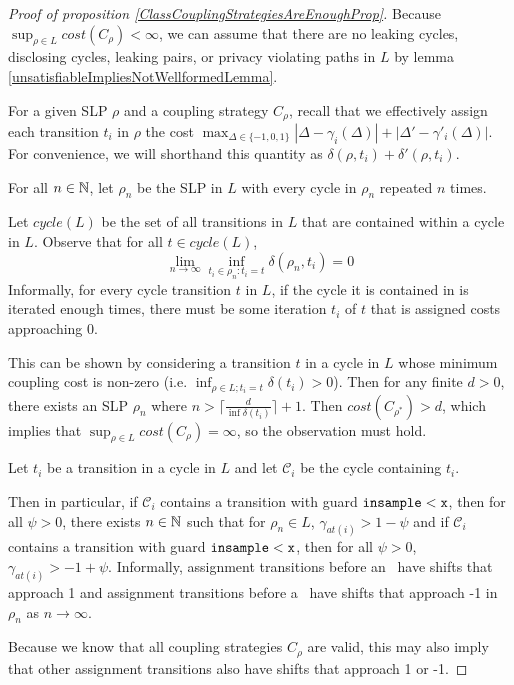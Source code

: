 \begin{proof}[Proof of proposition \ref{ClassCouplingStrategiesAreEnoughProp}]


    Because $\sup_{\rho\in L}cost(C_\rho)< \infty$, we can assume that there are no leaking cycles, disclosing cycles, leaking pairs, or privacy violating paths in $L$ by lemma \ref{unsatisfiableImpliesNotWellformedLemma}.


    For a given SLP $\rho$ and a coupling strategy $C_\rho$, recall that we effectively assign each transition $t_i$ in $\rho$ the cost $\max_{\Delta \in \{-1, 0, 1\}}|\Delta - \gamma_i(\Delta)| + |\Delta' - \gamma'_i(\Delta)|$. For convenience, we will shorthand this quantity as $\delta(\rho, t_i) + \delta'(\rho, t_i)$.


    For all $n\in \NN$, let $\rho_n$ be the SLP in $L$ with every cycle in $\rho_n$ repeated $n$ times. 

   Let $cycle(L)$ be the set of all transitions in $L$ that are contained within a cycle in $L$. Observe that for all $t\in cycle(L)$, \[
        \lim_{n\to\infty}\inf_{t_i\in\rho_n: t_i=t} \delta(\rho_n, t_i) = 0
    \]
    Informally, for every cycle transition $t$ in $L$, if the cycle it is contained in is iterated enough times, there must be some iteration $t_i$ of $t$ that is assigned costs approaching 0. 

    This can be shown by considering a transition $t$ in a cycle in $L$ whose minimum coupling cost is non-zero (i.e. $\inf_{\rho\in L; t_i=t} \delta(t_i) > 0$). Then for any finite $d>0$, there exists an SLP $\rho_n$ where $n>\lceil\frac{d}{\inf\delta(t_i)}\rceil+1$. Then $cost(C_{\rho^*})>d$, which implies that $\sup_{\rho\in L}cost(C_\rho) = \infty$, so the observation must hold. 

    Let $t_i$ be a transition in a cycle in $L$ and let $\mathcal{C}_i$ be the cycle containing $t_i$. 

    Then in particular, if $\mathcal{C}_i$ contains a transition with guard $\lguard[\texttt{x}]$, then for all $\psi>0$, there exists $n\in \NN$ such that for $\rho_n\in L$, $\gamma_{at(i)}> 1-\psi$ and if $\mathcal{C}_i$ contains a transition with guard $\lguard[\texttt{x}]$, then for all $\psi>0$, $\gamma_{at(i)}> -1+\psi$. 
    Informally, assignment transitions before an \lcycle\ have shifts that approach 1 and assignment transitions before a \gcycle\ have shifts that approach -1 in $\rho_n$ as $n\to\infty$. 

    Because we know that all coupling strategies $C_{\rho}$ are valid, this may also imply that other assignment transitions also have shifts that approach 1 or -1. 


\end{proof}
